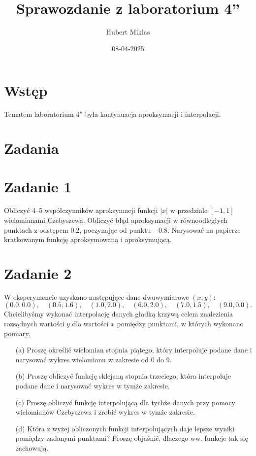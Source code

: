 \documentclass{article}
\title{Sprawozdanie z laboratorium 4''}
\author{Hubert Miklas}
\date{08-04-2025}
\begin{document}
\maketitle

\section{Wstęp}

Tematem laboratorium 4'' była kontynuacja aproksymacji i interpolacji.

\section{Zadania}

\section*{Zadanie 1}

Obliczyć 4–5 współczynników aproksymacji funkcji $|x|$ w przedziale $[-1,1]$ wielomianami Czebyszewa. Obliczyć błąd aproksymacji w równoodległych punktach z odstępem 0.2, poczynając od punktu $-0.8$. Narysować na papierze kratkowanym funkcję aproksymowaną i aproksymującą.

\section*{Zadanie 2}

W eksperymencie uzyskano następujące dane dwuwymiarowe $(x,y)$:
\[
(0.0, 0.0),\quad (0.5, 1.6),\quad (1.0, 2.0),\quad (6.0, 2.0),\quad (7.0, 1.5),\quad (9.0, 0.0).
\]
Chcielibyśmy wykonać interpolację danych gładką krzywą celem znalezienia rozsądnych wartości $y$ dla wartości $x$ pomiędzy punktami, w których wykonano pomiary.

\begin{enumerate}
    \item[(a)] Proszę określić wielomian stopnia piątego, który interpoluje podane dane i narysować wykres wielomianu w zakresie od 0 do 9.
    \item[(b)] Proszę obliczyć funkcję sklejaną stopnia trzeciego, która interpoluje podane dane i narysować wykres w tymże zakresie.
    \item[(c)] Proszę obliczyć funkcję interpolującą dla tychże danych przy pomocy wielomianów Czebyszewa i zrobić wykres w tymże zakresie.
    \item[(d)] Która z wyżej obliczonych funkcji interpolujących daje lepsze wyniki pomiędzy zadanymi punktami? Proszę objaśnić, dlaczego ww. funkcje tak się zachowują.
\end{enumerate}
\end{document}
